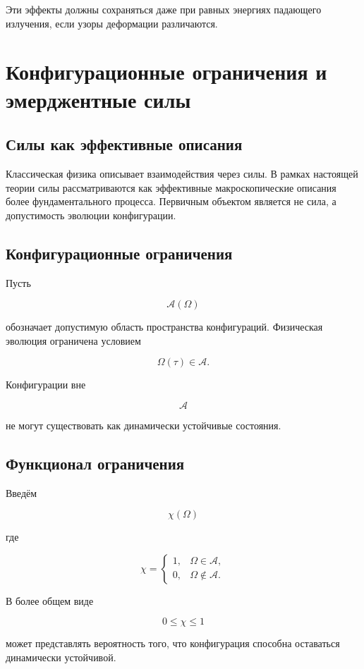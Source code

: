 Эти эффекты должны сохраняться даже при равных энергиях падающего излучения, если узоры деформации различаются.

\chapter{Конфигурационные ограничения и эмерджентные силы}

\section{Силы как эффективные описания}

Классическая физика описывает взаимодействия через силы. В рамках настоящей теории силы рассматриваются как эффективные макроскопические описания более фундаментального процесса. Первичным объектом является не сила, а допустимость эволюции конфигурации.

\section{Конфигурационные ограничения}

Пусть

\[ \mathcal A(\Omega) \]

обозначает допустимую область пространства конфигураций. Физическая эволюция ограничена условием

\[ \boxed{ \Omega(\tau)\in\mathcal A. } \]

Конфигурации вне

\[ \mathcal A \]

не могут существовать как динамически устойчивые состояния.

\section{Функционал ограничения}

Введём

\[ \boxed{ \chi(\Omega) } \]

где

\[ \chi= \begin{cases} 1,&\Omega\in\mathcal A,\\ 0,&\Omega\notin\mathcal A. \end{cases} \]

В более общем виде

\[ 0\le\chi\le1 \]

может представлять вероятность того, что конфигурация способна оставаться динамически устойчивой.

